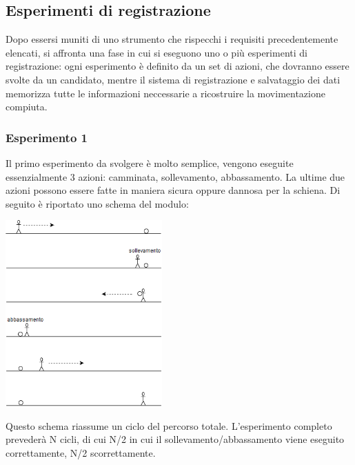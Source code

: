 \documentclass[a4paper]{article}
\begin{document}
	\subsection{Esperimenti di registrazione}
Dopo essersi muniti di uno strumento che rispecchi i requisiti precedentemente elencati, si  affronta una fase in cui si eseguono uno o più esperimenti di registrazione: ogni esperimento è definito da un set di azioni, che dovranno essere svolte da un candidato, mentre il sistema di registrazione e salvataggio dei dati memorizza tutte le informazioni neccessarie a ricostruire la movimentazione compiuta.

	\subsubsection{Esperimento 1}
Il primo esperimento da svolgere è molto semplice, vengono eseguite essenzialmente 3 azioni: camminata, sollevamento, abbassamento.
La ultime due azioni possono essere fatte in maniera sicura oppure dannosa per la schiena.
Di seguito è riportato uno schema del modulo:\\

\begin{center}
	\includegraphics[width=60mm,scale=0.7]{./images/esperimento1.png} 
	\makebox[\linewidth]{}
\end{center} 
Questo schema riassume un ciclo del percorso totale. L’esperimento completo prevederà N cicli, di cui N/2 in cui il sollevamento/abbassamento viene eseguito correttamente, N/2 scorrettamente.

\end{document}
